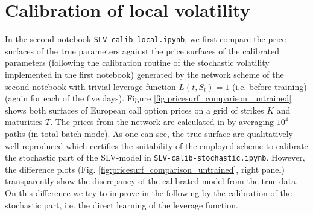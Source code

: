\documentclass[
a4paper,     %
12pt           %
]{scrartcl}  %
\numberwithin{equation}{section}
\begin{document}
\section{Calibration of local volatility}\label{sec:calibLV}

In the second notebook \texttt{SLV-calib-local.ipynb}, we first compare the price surfaces of the true parameters against the price surfaces of the calibrated parameters (following the calibration routine of the stochastic volatility implemented in the first notebook) generated by the network scheme of the second notebook with trivial leverage function $L(t,S_t)=1$ (i.e. before training) (again for each of the five days). Figure \ref{fig:pricesurf_comparison_untrained} shows both surfaces of European call option prices on a grid of strikes $K$ and maturities $T$. The prices from the network are calculated in by averaging $10^4$ paths (in total batch mode). As one can see, the true surface are qualitatively well reproduced which certifies the suitability of the employed scheme to calibrate the stochastic part of the SLV-model in \texttt{SLV-calib-stochastic.ipynb}. However, the difference plots (Fig. \ref{fig:pricesurf_comparison_untrained}, right panel) transparently show the discrepancy of the calibrated model from the true data. On this difference we try to improve in the following by the calibration of the stochastic part, i.e. the direct learning of the leverage function.
\end{document}
